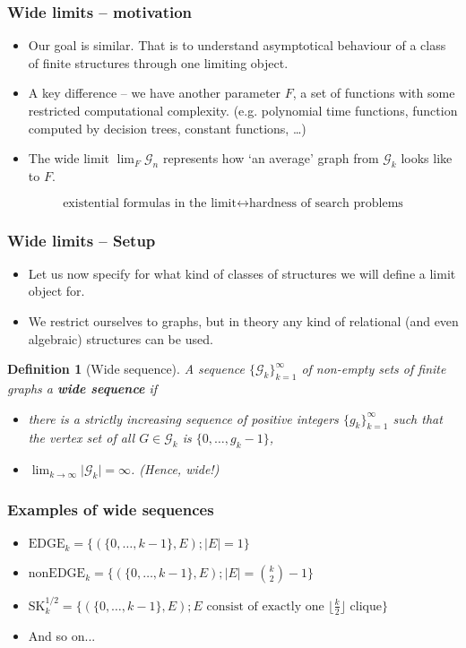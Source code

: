 \documentclass{beamer}
\newcommand{\G}{\mathcal{G}}
\newcommand{\0}{\textbf{0}}
\newcommand{\1}{\textbf{1}}
\newcommand{\abs}[1]{\lvert #1 \rvert}
\newcommand{\EDGE}{\text{EDGE}}
\newcommand{\nonEDGE}{\text{nonEDGE}}
\newcommand{\SK}{\text{SK}}
\newtheorem{defi}{Definition}
\begin{document}
\begin{frame}
\frametitle{Wide limits -- motivation}
\begin{itemize}[<+->] 
\item Our goal is similar. That is to understand asymptotical behaviour of a class of finite structures through one limiting object.
\item A key difference -- we have another parameter $F$, a set of functions with some restricted computational complexity. (e.g. polynomial time functions, function computed by decision trees, constant functions, \dots)
\item The wide limit $\lim_F \G_n$ represents how `an average' graph from $\G_k$ looks like to $F$. 
\end{itemize}
\vspace{1em}
\pause
\[\text{existential formulas in the limit}\leftrightarrow\text{hardness of search problems}\]
\end{frame}

\begin{frame}
\frametitle{Wide limits -- Setup}
\begin{itemize}[<+->] 
\item Let us now specify for what kind of classes of structures we will define a limit object for.
\item We restrict ourselves to graphs, but in theory any kind of relational (and even algebraic) structures can be used.
\end{itemize}
\pause
\begin{defi}[Wide sequence]
A sequence $\{\G_k\}_{k=1}^\infty$ of non-empty sets of finite graphs a \textbf{wide sequence} if
\begin{itemize}
\item there is a strictly increasing sequence of positive integers $\{g_k\}_{k=1}^\infty$ such that the vertex set of all $G\in\G_k$ is $\{0,\dots,g_k-1\}$,
\item $\lim_{k\to\infty}\abs{\G_k}=\infty$. (Hence, wide!)
\end{itemize}
\end{defi}
\end{frame}

\begin{frame}
\frametitle{Examples of wide sequences}
\begin{itemize}[<+->]
\item $\EDGE_k=\{(\{0,\dots,k-1\},E);\abs{E}=1\}$
\item $\nonEDGE_k=\{(\{0,\dots,k-1\},E);\abs{E}=\binom{k}{2}-1\}$
\item $\SK_k^{1/2}=\{(\{0,\dots,k-1\},E);E\text{ consist of exactly one $\lfloor\frac{k}{2} \rfloor$ clique}\}$
\item And so on...
\end{itemize}
\end{frame}
\end{document}
